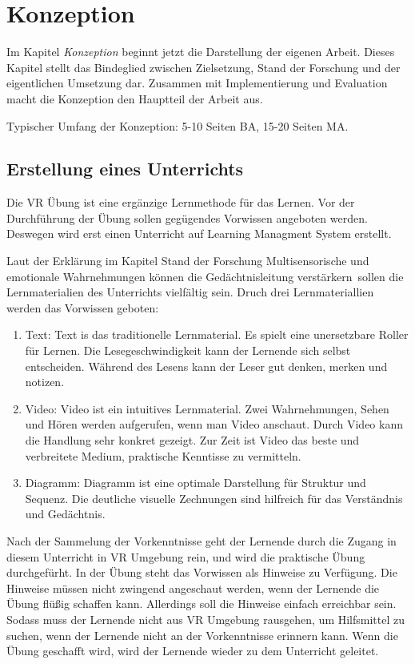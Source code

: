 \chapter{Konzeption}

Im Kapitel {\em Konzeption} beginnt jetzt die Darstellung der eigenen Arbeit. Dieses Kapitel stellt das Bindeglied zwischen Zielsetzung, Stand der Forschung und der eigentlichen Umsetzung dar. Zusammen mit Implementierung und Evaluation macht die Konzeption den Hauptteil der Arbeit aus.

Typischer Umfang der Konzeption: 5-10 Seiten BA, 15-20 Seiten MA.

\section{Erstellung eines Unterrichts}
Die VR Übung ist eine ergänzige Lernmethode für das Lernen. Vor der Durchführung der Übung sollen gegügendes Vorwissen angeboten werden. Deswegen wird erst einen Unterricht auf Learning Managment System erstellt.

Laut der Erklärung im Kapitel Stand der Forschung \glqq Multisensorische und emotionale Wahrnehmungen können die Gedächtnisleitung verstärkern\grqq\ sollen die Lernmaterialien des Unterrichts vielfältig sein.  Druch drei Lernmateriallien werden das Vorwissen geboten:
\begin{enumerate}
    \item Text: Text is das traditionelle Lernmaterial. Es spielt eine unersetzbare Roller für Lernen. Die Lesegeschwindigkeit kann der Lernende sich selbst entscheiden. Während des Lesens kann der Leser gut denken, merken und notizen.
    \item Video: Video ist ein intuitives Lernmaterial. Zwei Wahrnehmungen, Sehen und Hören werden aufgerufen, wenn man Video anschaut. Durch Video kann die Handlung sehr konkret gezeigt. Zur Zeit ist Video das beste und verbreitete Medium, praktische Kenntisse zu vermitteln.
    \item Diagramm: Diagramm ist eine optimale Darstellung für Struktur und Sequenz. Die deutliche visuelle Zechnungen sind hilfreich für das Verständnis und Gedächtnis.
\end{enumerate}

Nach der Sammelung der Vorkenntnisse geht der Lernende durch die Zugang in diesem Unterricht in VR Umgebung rein, und wird die praktische Übung durchgefürht. In der Übung steht das Vorwissen als Hinweise zu Verfügung. Die Hinweise müssen nicht zwingend angeschaut werden, wenn der Lernende die Übung flüßig schaffen kann. Allerdings soll die Hinweise einfach erreichbar sein. Sodass muss der Lernende nicht aus VR Umgebung rausgehen, um Hilfsmittel zu suchen, wenn der Lernende nicht an der Vorkenntnisse erinnern kann. Wenn die Übung geschafft wird, wird der Lernende wieder zu dem Unterricht geleitet.

